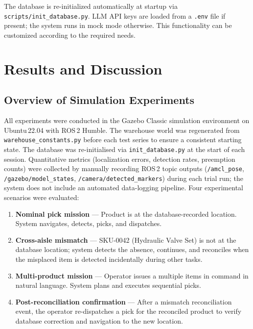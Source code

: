 \documentclass[12pt,a4paper]{report}
\begin{document}
The database is re-initialized automatically at startup via \texttt{scripts/init\_database.py}. LLM API keys are loaded from a \texttt{.env} file if present; the system runs in mock mode otherwise. This functionality can be customized according to the required needs.

\chapter{Results and Discussion}
\label{ch:results}

\section{Overview of Simulation Experiments}

All experiments were conducted in the Gazebo Classic simulation environment on Ubuntu\,22.04 with ROS\,2 Humble. The warehouse world was regenerated from \texttt{warehouse\_constants.py} before each test series to ensure a consistent starting state. The database was re-initialised via \texttt{init\_database.py} at the start of each session. Quantitative metrics (localization errors, detection rates, preemption counts) were collected by manually recording ROS\,2 topic outputs (\texttt{/amcl\_pose}, \texttt{/gazebo/model\_states}, \texttt{/camera/detected\_markers}) during each trial run; the system does not include an automated data-logging pipeline. Four experimental scenarios were evaluated:

\begin{enumerate}[label=\textbf{S\arabic*.}]
    \item \textbf{Nominal pick mission} — Product is at the database-recorded location. System navigates, detects, picks, and dispatches.
    \item \textbf{Cross-aisle mismatch} — SKU-0042 (Hydraulic Valve Set) is not at the database location; system detects the absence, continues, and reconciles when the misplaced item is detected incidentally during other tasks.
    \item \textbf{Multi-product mission} — Operator issues a multiple items in command in natural language. System plans and executes sequential picks.
    \item \textbf{Post-reconciliation confirmation} — After a mismatch reconciliation event, the operator re-dispatches a pick for the reconciled product to verify database correction and navigation to the new location.
\end{enumerate}
\end{document}
